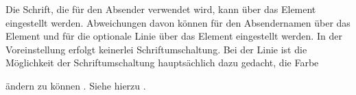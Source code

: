 \BeginIndexGroup
{}%
%
%
Die Schrift, die für den Absender verwendet wird, kann über das Element
%
 eingestellt werden. Abweichungen davon
können für den Absendernamen über das Element
%
 und für die %
\iffalse%
mit \Option{fromrule} gesetzte %
\else %
optionale %
\fi%
Linie über das Element %
 eingestellt werden. In der Voreinstellung
erfolgt keinerlei Schriftumschaltung. Bei der Linie ist die Möglichkeit der
Schriftumschaltung hauptsächlich dazu gedacht, die Farbe %

ändern zu können%
%
. Siehe hierzu \cite{package:xcolor}.%
%
\EndIndexGroup
%
